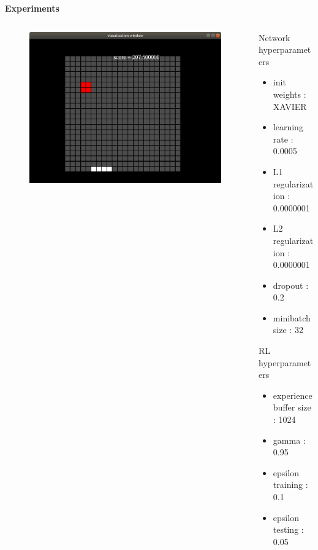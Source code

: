 \documentclass[xcolor=dvipsnames]{beamer}
\begin{document}
\begin{frame}{\bf Experiments}

  \begin{columns}
  \begin{column}{0.5\textwidth}

    \begin{figure}[!htb]
      \centering
      \includegraphics[scale=0.2]{../../diagrams/catcher.png}
      \label{img:dqn_test_game}
    \end{figure}


  \end{column}
  \begin{column}{0.5\textwidth}  %

    \scriptsize
    {
      Network hyperparameters
      \begin{itemize}
        \item init weights  : XAVIER
        \item learning rate : 0.0005
        \item L1 regularization : 0.0000001
        \item L2 regularization : 0.0000001
        \item dropout           : 0.2
        \item minibatch size    : 32
      \end{itemize}

      RL hyperparameters
      \begin{itemize}
        \item experience buffer size  : 1024
        \item gamma : 0.95
        \item epsilon training : 0.1
        \item epsilon testing : 0.05
      \end{itemize}
    }
  \end{column}
  \end{columns}


\end{frame}
\end{document}
